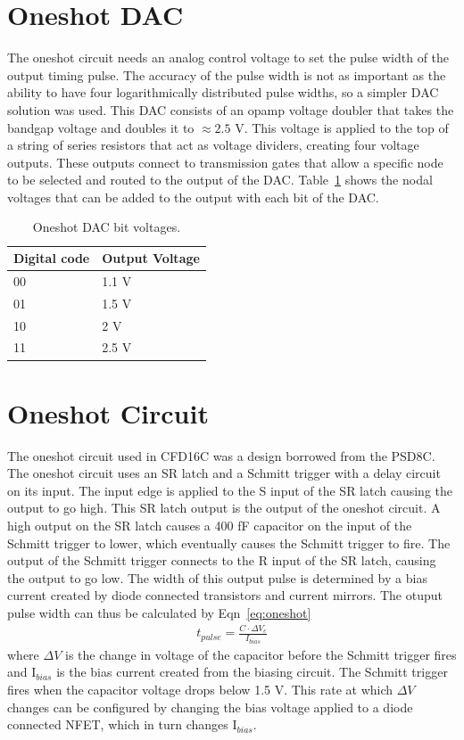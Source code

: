 \documentclass[12pt,oneside,final]{siuethesis}
\theoremstyle{definition}
\begin{document}
\section{Oneshot DAC}
\par The oneshot circuit needs an analog control voltage to set the pulse width of the output timing pulse. The accuracy of the pulse width is not as important as the ability to have four logarithmically distributed pulse widths, so a simpler DAC solution was used. This DAC consists of an opamp voltage doubler that takes the bandgap voltage and doubles it to $\approx 2.5$ V. This voltage is applied to the top of a string of series resistors that act as voltage dividers, creating four voltage outputs. These outputs connect to transmission gates that allow a specific node to be selected and routed to the output of the DAC. Table~\ref{tab:dac} shows the nodal voltages that can be added to the output with each bit of the DAC.
\begin{table}[ht]
\centering
	\begin{tabular}{|l|p{4cm}|}
		\hline
		Digital code & Output Voltage\\\hline
		00 & 1.1 V\\\hline
		01 & 1.5 V\\\hline
		10 & 2 V\\\hline
		11 & 2.5 V\\\hline
	\end{tabular}
    \caption{Oneshot DAC bit voltages.}
 	\label{tab:dac}
\end{table}

\section{Oneshot Circuit}
\par The oneshot circuit used in CFD16C was a design borrowed from the PSD8C. The oneshot circuit uses an SR latch and a Schmitt trigger with a delay circuit on its input. The input edge is applied to the S input of the SR latch causing the output to go high. This SR latch output is the output of the oneshot circuit. A high output on the SR latch causes a 400 fF capacitor on the input of the Schmitt trigger to lower, which eventually causes the Schmitt trigger to fire. The output of the Schmitt trigger connects to the R input of the SR latch, causing the output to go low. The width of this output pulse is determined by a bias current created by diode connected transistors and current mirrors. The otuput pulse width can thus be calculated by Eqn~\ref{eq:oneshot} 
\begin{align}
t_{pulse} = \frac{C \cdot \Delta V_{c}}{I_{bias}}
\label{eq:oneshot}
\end{align}
where $\Delta V$ is the change in voltage of the capacitor before the Schmitt trigger fires and I$_{bias}$ is the bias current created from the biasing circuit. The Schmitt trigger fires when the capacitor voltage drops below 1.5 V. This rate at which $\Delta V$ changes can be configured by changing the bias voltage applied to a diode connected NFET, which in turn changes I$_{bias}$.
\end{document}
